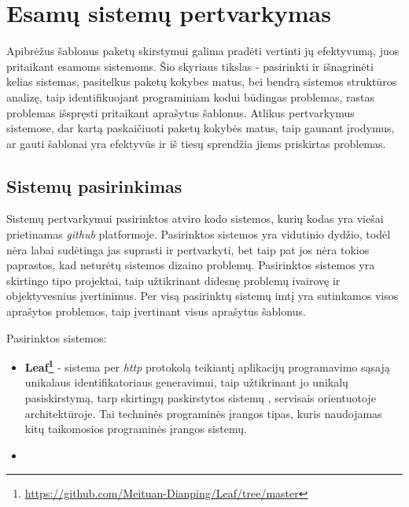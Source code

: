 \section{Esamų sistemų pertvarkymas}
Apibrėžus šablonus paketų skirstymui galima pradėti vertinti jų efektyvumą, juos pritaikant esamoms sistemoms.
Šio skyriaus tikslas - pasirinkti ir išnagrinėti kelias sistemas, pasitelkus paketų kokybes matus, bei bendrą sistemos struktūros analizę,
taip identifikuojant programiniam kodui būdingas problemas, rastas problemas išspręsti pritaikant aprašytus šablonus.
Atlikus pertvarkymus sistemose, dar kartą paskaičiuoti paketų kokybės matus,
taip gaunant įrodymus, ar gauti šablonai yra efektyvūs ir iš tiesų sprendžia
jiems priskirtas problemas.


\subsection{Sistemų pasirinkimas}
Sistemų pertvarkymui pasirinktos atviro kodo sistemos, kurių kodas yra viešai prietinamas \textit{github} platformoje.
Pasirinktos sistemos yra vidutinio dydžio, todėl nėra labai sudėtinga jas suprasti ir pertvarkyti, bet taip pat jos nėra
tokios paprastos, kad neturėtų sistemos dizaino problemų.
Pasirinktos sistemos yra skirtingo tipo projektai, taip užtikrinant didesnę problemų ivairovę ir objektyvesnius įvertinimus.
Per visą pasirinktų sistemų imtį yra sutinkamos visos aprašytos problemos, taip įvertinant visus aprašytus šablonus.

Pasirinktos sistemos:
\begin{itemize}
    \item \textbf{Leaf\footnote{\url{https://github.com/Meituan-Dianping/Leaf/tree/master}}} - sistema per \textit{http}
    protokolą teikiantį aplikacijų programavimo sąsają
    unikalaus identifikatoriaus generavimui, taip užtikrinant jo unikalų pasiskirstymą, tarp skirtingų paskirstytos sistemų ,
    servisais orientuotoje  architektūroje.
    Tai techninės programinės įrangos tipas, kuris naudojamas kitų taikomosios programinės įrangos sistemų.
    \item
\end{itemize}

